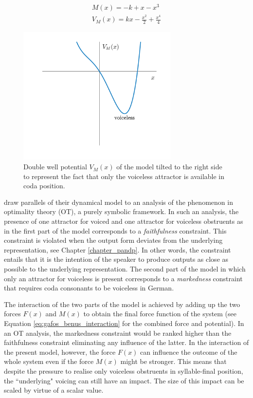 \begin{equation}
\begin{split}
M(x) = -k+x-x^3\\
V_M(x) = kx - \frac{x^2}{2} + \frac{x^4}{4}
\end{split}
\label{eq:gafos_benus_coda_force_potential}
\end{equation}

\begin{figure}[h]
\begin{center}
\includegraphics[width=8cm]{figures/ch3/gafos_benus_coda_potential.pdf}
\caption[Tilted double well potential $V_M(x)$ of the \citet{GafosBenus2006} model.]{Double well potential $V_M(x)$ of the \citet{GafosBenus2006} model tilted to the right side to represent the fact that only the voiceless attractor is available in coda position.}
\label{fig:gafos_benus_coda_potential}
\end{center}
\end{figure}

\citet{GafosBenus2006} draw parallels of their dynamical model to an analysis of the phenomenon in optimality theory (OT), a purely symbolic framework. In such an analysis, the presence of one attractor for voiced and one attractor for voiceless obstruents as in the first part of the model corresponds to a \emph{faithfulness} constraint. This constraint is violated when the output form deviates from the underlying representation, see Chapter \ref{chapter_pandp}. In other words, the constraint entails that it is the intention of the speaker to produce outputs as close as possible to the underlying representation. The second part of the model in which only an attractor for voiceless is present corresponds to a \emph{markedness} constraint that requires coda consonants to be voiceless in German.

The interaction of the two parts of the model is achieved by adding up the two forces $F(x)$ and $M(x)$ to obtain the final force function of the system (see Equation \ref{eq:gafos_benus_interaction} for the combined force and potential). In an OT analysis, the markedness constraint would be ranked higher than the faithfulness constraint eliminating any influence of the latter. In the interaction of the present model, however, the force $F(x)$ can influence the outcome of the whole system even if the force $M(x)$ might be stronger. This means that despite the pressure to realise only voiceless obstruents in syllable-final position, the ``underlying" voicing can still have an impact. The size of this impact can be scaled by virtue of a scalar value.

